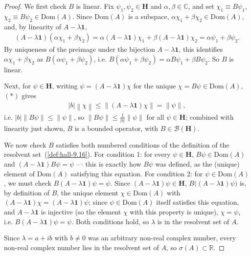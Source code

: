 \begin{proof}
We first check $B$ is linear. Fix $\psi_1, \psi_2 \in \mathbf{H}$ and $\alpha, \beta \in \mathbb{C}$, and set $\chi_1 \equiv B\psi_1$, $\chi_2 \equiv B\psi_2 \in \text{Dom}(A)$. Since $\text{Dom}(A)$ is a subspace, $\alpha\chi_1 + \beta\chi_2 \in \text{Dom}(A)$, and, by linearity of $A - \lambda\mathbf{1}$,
\begin{align}
    (A-\lambda\mathbf{1})(\alpha\chi_1+\beta\chi_2) = \alpha(A-\lambda\mathbf{1})\chi_1 + \beta(A-\lambda\mathbf{1})\chi_2 = \alpha\psi_1 + \beta\psi_2.
\end{align}
By uniqueness of the preimage under the bijection $A - \lambda\mathbf{1}$, this identifies $\alpha\chi_1+\beta\chi_2$ as $B(\alpha\psi_1+\beta\psi_2)$, i.e. $B(\alpha\psi_1+\beta\psi_2) = \alpha B\psi_1 + \beta B\psi_2$. So $B$ is linear.

Next, for $\psi \in \mathbf{H}$, writing $\psi = (A - \lambda\mathbf{1})\chi$ for the unique $\chi = B\psi \in \text{Dom}(A)$, $(\ast)$ gives
\begin{align}
    \lvert b \rvert \left\| \chi \right\| \le \left\| (A - \lambda \mathbf{1})\chi \right\| = \left\| \psi \right\|,
\end{align}
i.e. $\lvert b \rvert \left\| B\psi \right\| \le \left\| \psi \right\|$, so $\left\| B\psi \right\| \le \tfrac{1}{\lvert b \rvert} \left\| \psi \right\|$ for all $\psi \in \mathbf{H}$; combined with linearity just shown, $B$ is a bounded operator, with $B \in \mathcal{B}(\mathbf{H})$.

We now check $B$ satisfies both numbered conditions of the definition of the resolvent set~(\ref{def:hall-9.16}). For condition 1: for every $\psi \in \mathbf{H}$, $B\psi \in \text{Dom}(A)$ and $(A-\lambda\mathbf{1})B\psi = \psi$ — this is exactly how $B\psi$ was defined, as the (unique) element of $\text{Dom}(A)$ satisfying this equation. For condition 2: for $\psi \in \text{Dom}(A)$, we must check $B(A-\lambda\mathbf{1})\psi = \psi$. Since $(A-\lambda\mathbf{1})\psi \in \mathbf{H}$, $B\big((A-\lambda\mathbf{1})\psi\big)$ is, by definition of $B$, the unique element $\chi \in \text{Dom}(A)$ with $(A-\lambda\mathbf{1})\chi = (A-\lambda\mathbf{1})\psi$; since $\psi \in \text{Dom}(A)$ itself satisfies this equation, and $A - \lambda\mathbf{1}$ is injective (so the element $\chi$ with this property is unique), $\chi = \psi$, i.e. $B(A-\lambda\mathbf{1})\psi = \psi$. Both conditions hold, so $\lambda$ is in the resolvent set of $A$.

Since $\lambda = a + ib$ with $b \ne 0$ was an arbitrary non-real complex number, every non-real complex number lies in the resolvent set of $A$, so $\sigma(A) \subset \mathbb{R}$.
\end{proof}

